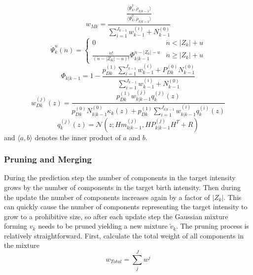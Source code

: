 \documentclass{article}
\begin{document}
\begin{equation}
  \label{eq:wmk}
  w_{Mk} = \frac{\frac{\langle\ddot{\Psi}_k^1,\ddot{\rho}_{k|k-1}\rangle}{\langle\ddot{\Psi}_k^0,\ddot{\rho}_{k|k-1}\rangle}}{\sum_{i=1}^{J_{k-1}}w_{k-1}^{(i)} + N_{k-1}^{(0)}}
\end{equation}
\begin{equation}
  \label{eq:psi}
  \ddot{\Psi}_k^u(\ddot{n}) =
  \begin{cases}
    0 & \ddot{n} < |Z_k| + u \\
   \frac{\ddot{n}!}{(\ddot{n}-|Z_K|-u)!}\Phi_{k|k-1}^{\ddot{n} - |Z_k|-u} & \ddot{n} \ge |Z_k|+u
  \end{cases}
\end{equation}
\begin{equation}
  \label{eq:Phi}
  \Phi_{k|k-1} = 1 - \frac{p_{Dk}^{(1)}\sum_{i=1}^{J_{k-1}}w_{k-1}^{(i)} + P_{Dk}^{(0)}N_{k-1}^{(0)}}{\sum_{i=1}^{J_{k-1}}w_{k-1}^{(i)} + N_{k-1}^{(0)}}
\end{equation}
\begin{equation}
  \label{eq:wD}
  w_{Dk}^{(j)}(z) = \frac{p_{Dk}^{(1)}w_{k|k-1}^{(j)}q_k^{(j)}(z)}{p_{Dk}^{(0)}N_{k|k-1}^{(0)}\kappa_k(z) +  p_{Dk}^{(1)}\sum_{i=1}^{J_{k|k-1}}w_{k|k-1}^{(i)}q_k^{(i)}(z)  }
\end{equation}
\begin{equation}
  \label{eq:qz}
  q_k^{(j)}(z) = \mathcal{N}(z;Hm_{k|k-1}^{(j)}, HP_{k|k-1}^{(j)}H^T + R)
\end{equation}
and $\langle a, b \rangle$ denotes the inner product of $a$ and $b$.

\subsubsection{Pruning and Merging}
During the prediction step the number of components in the target intensity grows by the number of components in the target birth intensity. Then during the update the number of components increases again by a factor of $|Z_k|$. This can quickly cause the number of components representing the target intensity to grow to a prohibitive size, so after each update step the Gaussian mixture forming $v_{k}$ needs to be pruned yielding a new mixture $\tilde{v}_k$. The pruning process is relatively straightforward. First, calculate the total weight of all components in the mixture
\begin{equation}
  \label{eq:wtotal}
  w_{Total} = \sum_j^Jw^j
\end{equation}
\end{document}
